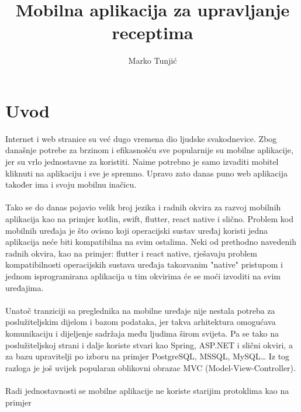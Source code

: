 \documentclass[times, utf8, zavrsni]{fer}
\begin{document}

\title{Mobilna aplikacija za upravljanje receptima}

\author{Marko Tunjić}

\maketitle

\zahvala{}

\tableofcontents

\chapter{Uvod}
Internet i web stranice su već dugo vremena dio ljudske svakodnevice. Zbog
današnje potrebe za brzinom i efikasnošću sve popularnije su mobilne aplikacije,
jer su vrlo jednostavne za koristiti. Naime potrebno je samo izvaditi mobitel
kliknuti na aplikaciju i sve je spremno. Upravo zato danas puno web aplikacija
također ima i svoju mobilnu inačicu.
\\\\
Tako se do danas pojavio velik broj jezika
i radnih okvira za razvoj mobilnih aplikacija kao na primjer kotlin, swift, flutter,
react native i slično. Problem kod mobilnih uređaja je što ovisno koji operacijski
sustav uređaj koristi jedna aplikacija neće biti kompatibilna na svim ostalima.
Neki od prethodno navedenih radnih okvira, kao na primjer: flutter i react native,
rješavaju problem kompatibilnosti operacijskih sustava uređaja takozvanim "native" pristupom
i jednom isprogramirana aplikacija u tim okvirima će se moći izvoditi na svim uređajima.
\\\\
Unatoč tranziciji sa preglednika na mobilne uređaje nije nestala potreba
za poslužiteljskim dijelom i bazom podataka, jer takva arhitektura omogućava
komunikaciju i dijeljenje sadržaja među ljudima širom svijeta. Pa se tako na
poslužiteljskoj strani i dalje koriste stvari kao Spring, ASP.NET i slični okviri,
a za bazu upravitelji po izboru na primjer PostgreSQL, MSSQL, MySQL\dots
Iz tog razloga je još uvijek popularan oblikovni obrazac MVC (Model-View-Controller).
\\\\
Radi jednostavnosti se mobilne aplikacije ne koriste starijim protoklima kao na primjer
\end{document}
